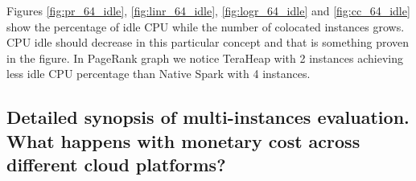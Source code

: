 Figures \ref{fig:pr_64_idle}, \ref{fig:linr_64_idle},
\ref{fig:logr_64_idle} and \ref{fig:cc_64_idle}  show the percentage
of idle CPU while the number of colocated instances grows. CPU idle
should decrease in this particular concept and that is something
proven in the figure. In PageRank graph we notice TeraHeap with 2
instances achieving less idle CPU percentage than Native Spark with 4
instances.

\subsection{Detailed synopsis of multi-instances evaluation. What
happens with monetary cost across different cloud platforms?}

\begin{table}[t!]
  \centering
  \caption{Page Rank synopsis table. Configurations starting
    with N denote a run with Native instances of Spark and with T with
    TeraHeap. H1 is a run with the memory budget configured to contain
    a bigger size for H1 than PageCache and PC the opposite.}
  \label{tab:linr_table}
\end{table}


